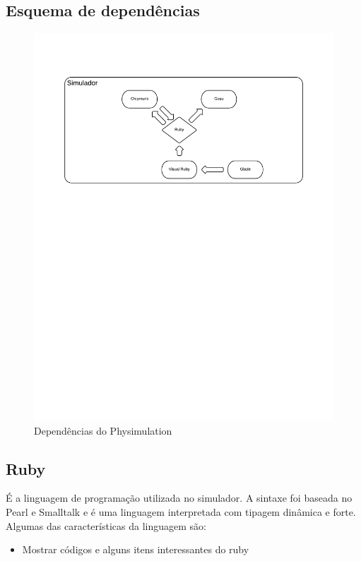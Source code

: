 \subsection{Esquema de dependências}

\begin{figure}[H]
	\centering
	\caption{Dependências do Physimulation}
	\includegraphics[scale=0.45]{images/esquema-dependencias.png}
\end{figure}

\subsection{Ruby}
É a linguagem de programação utilizada no simulador. A sintaxe foi baseada no Pearl e Smalltalk e é uma linguagem interpretada com tipagem dinâmica e forte.
Algumas das características da linguagem são:
\begin{itemize}
  \item Mostrar códigos e alguns itens interessantes do ruby
\end{itemize}

